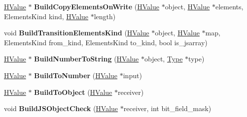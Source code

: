 \begin{DoxyCompactItemize}
\item 
\hyperlink{classv8_1_1internal_1_1_h_value}{H\+Value} $\ast$ {\bfseries Build\+Copy\+Elements\+On\+Write} (\hyperlink{classv8_1_1internal_1_1_h_value}{H\+Value} $\ast$object, \hyperlink{classv8_1_1internal_1_1_h_value}{H\+Value} $\ast$elements, Elements\+Kind kind, \hyperlink{classv8_1_1internal_1_1_h_value}{H\+Value} $\ast$length)\hypertarget{classv8_1_1internal_1_1_h_graph_builder_ac95722f346a3f07fc919a8daa37b2a26}{}\label{classv8_1_1internal_1_1_h_graph_builder_ac95722f346a3f07fc919a8daa37b2a26}

\item 
void {\bfseries Build\+Transition\+Elements\+Kind} (\hyperlink{classv8_1_1internal_1_1_h_value}{H\+Value} $\ast$object, \hyperlink{classv8_1_1internal_1_1_h_value}{H\+Value} $\ast$map, Elements\+Kind from\+\_\+kind, Elements\+Kind to\+\_\+kind, bool is\+\_\+jsarray)\hypertarget{classv8_1_1internal_1_1_h_graph_builder_a27138e81807f2ee30691c360a033774f}{}\label{classv8_1_1internal_1_1_h_graph_builder_a27138e81807f2ee30691c360a033774f}

\item 
\hyperlink{classv8_1_1internal_1_1_h_value}{H\+Value} $\ast$ {\bfseries Build\+Number\+To\+String} (\hyperlink{classv8_1_1internal_1_1_h_value}{H\+Value} $\ast$object, \hyperlink{classv8_1_1internal_1_1_type}{Type} $\ast$type)\hypertarget{classv8_1_1internal_1_1_h_graph_builder_a81c75712f4359bb1c9bf57536116639d}{}\label{classv8_1_1internal_1_1_h_graph_builder_a81c75712f4359bb1c9bf57536116639d}

\item 
\hyperlink{classv8_1_1internal_1_1_h_value}{H\+Value} $\ast$ {\bfseries Build\+To\+Number} (\hyperlink{classv8_1_1internal_1_1_h_value}{H\+Value} $\ast$input)\hypertarget{classv8_1_1internal_1_1_h_graph_builder_ab39eeab3dd7bea42911d684275a9d28d}{}\label{classv8_1_1internal_1_1_h_graph_builder_ab39eeab3dd7bea42911d684275a9d28d}

\item 
\hyperlink{classv8_1_1internal_1_1_h_value}{H\+Value} $\ast$ {\bfseries Build\+To\+Object} (\hyperlink{classv8_1_1internal_1_1_h_value}{H\+Value} $\ast$receiver)\hypertarget{classv8_1_1internal_1_1_h_graph_builder_a06254f618315d444412c8c24b3532e30}{}\label{classv8_1_1internal_1_1_h_graph_builder_a06254f618315d444412c8c24b3532e30}

\item 
void {\bfseries Build\+J\+S\+Object\+Check} (\hyperlink{classv8_1_1internal_1_1_h_value}{H\+Value} $\ast$receiver, int bit\+\_\+field\+\_\+mask)\hypertarget{classv8_1_1internal_1_1_h_graph_builder_a0567331adeff2f3f74acbe6ad06a1280}{}\label{classv8_1_1internal_1_1_h_graph_builder_a0567331adeff2f3f74acbe6ad06a1280}


\end{DoxyCompactItemize}
